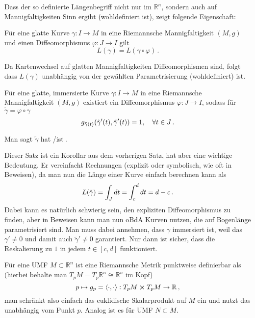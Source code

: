 Dass der so definierte Längenbegriff nicht nur im $\mathbb{R}^n$, sondern auch auf Mannigfaltigkeiten Sinn ergibt (wohldefiniert ist), zeigt folgende Eigenschaft:
\begin{satz}
Für eine glatte Kurve $\gamma: I \rightarrow M$ in eine Riemannsche Mannigfaltigkeit $(M, g)$ und einen Diffeomorphismus $\varphi: J \rightarrow I$ gilt
\begin{equation}
L(\gamma) = L(\gamma \circ \varphi) \, .
\end{equation}
\end{satz}
Da Kartenwechsel auf glatten Mannigfaltigkeiten Diffeomorphismen sind, folgt dass $L(\gamma)$ unabhängig von der gewählten Parametrisierung (wohldefiniert) ist.

\begin{satz}[Bogenlänge]
Für eine glatte, immersierte Kurve $\gamma: I \rightarrow M$ in eine Riemannsche Mannigfaltigkeit $(M, g)$ existiert ein Diffeomorphismus $\varphi: J \rightarrow I$, sodass für $\tilde{\gamma} = \varphi \circ \gamma$
\begin{equation}
g_{\tilde{\gamma}(t)}\qty(\tilde{\gamma}'(t), \tilde{\gamma}'(t)) = 1, \quad \forall t \in J \, .
\end{equation}

Man sagt $\tilde{\gamma}$ hat /ist .
\end{satz}

Dieser Satz ist ein Korollar aus dem vorherigen Satz, hat aber eine wichtige Bedeutung. Er vereinfacht Rechnungen (explizit oder symbolisch, wie oft in Beweisen), da man nun die Länge einer Kurve einfach berechnen kann als
\begin{equation*}
L\qty(\tilde{\gamma}) = \int_J dt = \int_c^d dt = d - c \, .
\end{equation*}
Dabei kann es natürlich schwierig sein, den expliziten Diffeomorphismus zu finden, aber in Beweisen kann man nun oBdA Kurven nutzen, die auf Bogenlänge parametrisiert sind. Man muss dabei annehmen, dass $\gamma$ immersiert ist, weil das $\gamma' \neq 0$ und damit auch $\tilde{\gamma}' \neq 0$ garantiert. Nur dann ist sicher, dass die Reskalierung zu $1$ in jedem $t \in [c, d]$ funktioniert.


\begin{bsp}[Untermannigfaltigkeit]
Für eine UMF $M \subset \mathbb{R}^n$ ist eine Riemannsche Metrik punktweise definierbar als (hierbei behalte man $T_p M = T_p \mathbb{R}^n \cong \mathbb{R}^n$ im Kopf)
\begin{equation}
p \mapsto g_p = \langle \cdot, \cdot \rangle: T_p M \cross T_p M \rightarrow \mathbb{R} \, ,
\end{equation}
man schränkt also einfach das euklidische Skalarprodukt auf $M$ ein und nutzt das unabhängig vom Punkt $p$. Analog ist es für UMF $N \subset M$. 
\end{bsp}


